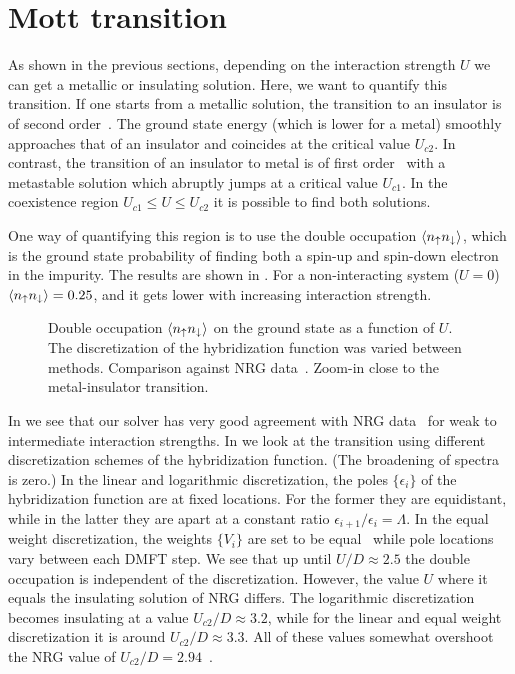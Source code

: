 \section{Mott transition}%
\label{sec:Mott-transistion}

As shown in the previous sections,
depending on the interaction strength $U$ we can get a metallic or insulating solution.
Here, we want to quantify this transition.
If one starts from a metallic solution,
the transition to an insulator is of second order~\cite{Georges1996}.
The ground state energy (which is lower for  a metal) smoothly approaches that of an insulator
and coincides at the critical value $U_{c2}$.
In contrast, the transition of an insulator to metal is of first order~\cite{Georges1996}
with a metastable solution which abruptly jumps at a critical value $U_{c1}$.
In the coexistence region $U_{c1} \le U \le U_{c2}$ it is possible to find both solutions.

One way of quantifying this region is to use the double occupation $\langle n_\uparrow n_\downarrow\rangle$,
which is the ground state probability of finding both a spin-up and spin-down electron
in the impurity.
The results are shown in .
For a non-interacting system ($U=0$) $\langle n_\uparrow n_\downarrow\rangle=0.25$,
and it gets lower with increasing interaction strength.
\begin{figure}[ht]
    \centering
    
    \caption{
        Double occupation $\langle n_\uparrow n_\downarrow\rangle$
        on the ground state as a function of $U$.
        The discretization of the hybridization function was varied between methods.
         Comparison against NRG data~\cite{Gauvin-Ndiaye2025}.
        Zoom-in close to the metal-insulator transition.
    }%
    \label{fig:double-occupation}
\end{figure}
In  we see that our solver has very good agreement with
NRG data~\cite{Gauvin-Ndiaye2025} for weak to intermediate interaction strengths.
In  we look at the transition using different discretization
schemes of the hybridization function.
(The broadening of spectra is zero.)
In the linear and logarithmic discretization, the poles $\{\epsilon_i\}$ of the hybridization function
are at fixed locations.
For the former they are equidistant,
while in the latter they are apart at a constant ratio $\epsilon_{i+1}/\epsilon_i = \Lambda$.
In the equal weight discretization,
the weights $\{V_i\}$ are set to be equal~\cite{Lu2019}
while pole locations vary between each DMFT step.
We see that up until $U/D\approx2.5$ the double occupation is independent of the discretization.
However, the value $U$ where it equals the insulating solution of NRG differs.
The logarithmic discretization becomes insulating at a value $U_{c2}/D\approx3.2$,
while for the linear and equal weight discretization it is around $U_{c2}/D\approx3.3$.
All of these values somewhat overshoot the NRG value of $U_{c2}/D=2.94$~\cite{Bulla1999}.

